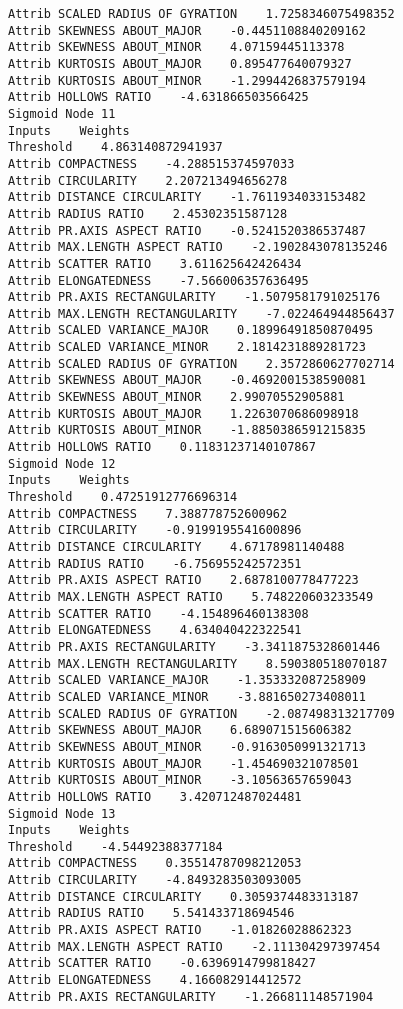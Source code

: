 \documentclass[
	article,			%
	11pt,				%
	oneside,			%
	a4paper,			%
	english,			%
	brazil,				%
	sumario=tradicional
	]{abntex2}
\begin{document}
\begin{lstlisting}
Attrib SCALED RADIUS OF GYRATION    1.7258346075498352
Attrib SKEWNESS ABOUT_MAJOR    -0.4451108840209162
Attrib SKEWNESS ABOUT_MINOR    4.07159445113378
Attrib KURTOSIS ABOUT_MAJOR    0.895477640079327
Attrib KURTOSIS ABOUT_MINOR    -1.2994426837579194
Attrib HOLLOWS RATIO    -4.631866503566425
Sigmoid Node 11
Inputs    Weights
Threshold    4.863140872941937
Attrib COMPACTNESS    -4.288515374597033
Attrib CIRCULARITY    2.207213494656278
Attrib DISTANCE CIRCULARITY    -1.7611934033153482
Attrib RADIUS RATIO    2.45302351587128
Attrib PR.AXIS ASPECT RATIO    -0.5241520386537487
Attrib MAX.LENGTH ASPECT RATIO    -2.1902843078135246
Attrib SCATTER RATIO    3.611625642426434
Attrib ELONGATEDNESS    -7.566006357636495
Attrib PR.AXIS RECTANGULARITY    -1.5079581791025176
Attrib MAX.LENGTH RECTANGULARITY    -7.022464944856437
Attrib SCALED VARIANCE_MAJOR    0.18996491850870495
Attrib SCALED VARIANCE_MINOR    2.1814231889281723
Attrib SCALED RADIUS OF GYRATION    2.3572860627702714
Attrib SKEWNESS ABOUT_MAJOR    -0.4692001538590081
Attrib SKEWNESS ABOUT_MINOR    2.99070552905881
Attrib KURTOSIS ABOUT_MAJOR    1.2263070686098918
Attrib KURTOSIS ABOUT_MINOR    -1.8850386591215835
Attrib HOLLOWS RATIO    0.11831237140107867
Sigmoid Node 12
Inputs    Weights
Threshold    0.47251912776696314
Attrib COMPACTNESS    7.388778752600962
Attrib CIRCULARITY    -0.9199195541600896
Attrib DISTANCE CIRCULARITY    4.67178981140488
Attrib RADIUS RATIO    -6.756955242572351
Attrib PR.AXIS ASPECT RATIO    2.6878100778477223
Attrib MAX.LENGTH ASPECT RATIO    5.748220603233549
Attrib SCATTER RATIO    -4.154896460138308
Attrib ELONGATEDNESS    4.634040422322541
Attrib PR.AXIS RECTANGULARITY    -3.3411875328601446
Attrib MAX.LENGTH RECTANGULARITY    8.590380518070187
Attrib SCALED VARIANCE_MAJOR    -1.353332087258909
Attrib SCALED VARIANCE_MINOR    -3.881650273408011
Attrib SCALED RADIUS OF GYRATION    -2.087498313217709
Attrib SKEWNESS ABOUT_MAJOR    6.689071515606382
Attrib SKEWNESS ABOUT_MINOR    -0.9163050991321713
Attrib KURTOSIS ABOUT_MAJOR    -1.454690321078501
Attrib KURTOSIS ABOUT_MINOR    -3.10563657659043
Attrib HOLLOWS RATIO    3.420712487024481
Sigmoid Node 13
Inputs    Weights
Threshold    -4.54492388377184
Attrib COMPACTNESS    0.35514787098212053
Attrib CIRCULARITY    -4.8493283503093005
Attrib DISTANCE CIRCULARITY    0.3059374483313187
Attrib RADIUS RATIO    5.541433718694546
Attrib PR.AXIS ASPECT RATIO    -1.01826028862323
Attrib MAX.LENGTH ASPECT RATIO    -2.111304297397454
Attrib SCATTER RATIO    -0.6396914799818427
Attrib ELONGATEDNESS    4.166082914412572
Attrib PR.AXIS RECTANGULARITY    -1.266811148571904

\end{lstlisting}
\end{document}

